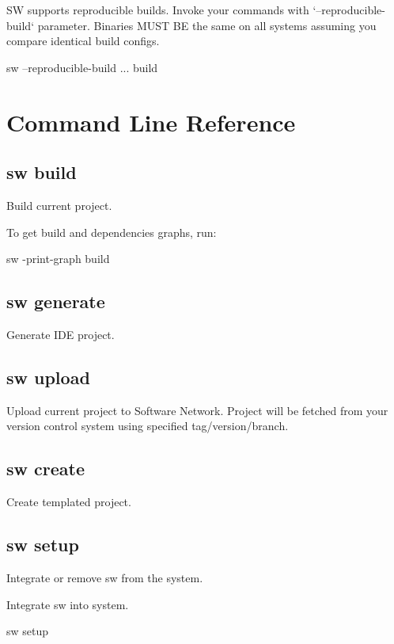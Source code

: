 SW supports reproducible builds.
Invoke your commands with `--reproducible-build` parameter.
Binaries MUST BE the same on all systems assuming you compare identical build configs.

\begin{command}
sw --reproducible-build ... build
\end{command}


\section{Command Line Reference}

\subsection{sw build}

Build current project.

To get build and dependencies graphs, run:
\begin{command}
sw -print-graph build
\end{command}

\subsection{sw generate}

Generate IDE project.

\subsection{sw upload}

Upload current project to Software Network.
Project will be fetched from your version control system using specified tag/version/branch.

\subsection{sw create}

Create templated project.

\subsection{sw setup}

Integrate or remove sw from the system.

Integrate sw into system.

\begin{command}
sw setup
\end{command}

